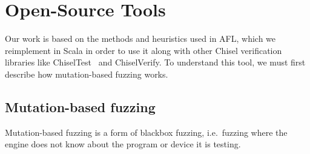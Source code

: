 \documentclass[conference]{IEEEtran}
\begin{document}
%
%



\section{Open-Source Tools}
\label{sec:tools}

Our work is based on the methods and heuristics used in AFL, which we reimplement in Scala in order to use it along with other Chisel verification libraries like ChiselTest~\cite{chisel:tester2} and ChiselVerify.
To understand this tool, we must first describe how mutation-based fuzzing works.

\subsection{Mutation-based fuzzing}
Mutation-based fuzzing is a form of blackbox fuzzing, i.e.\ fuzzing where the engine does not know about the program or device it is testing.
\end{document}
